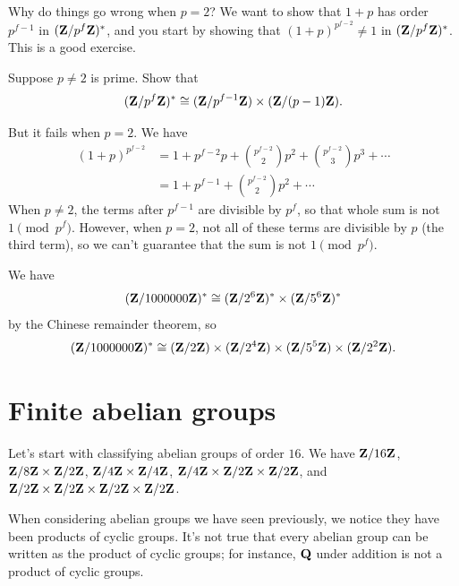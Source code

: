 \documentclass[11pt, twoside]{amsart}
\begin{document}
Why do things go wrong when $p=2$? We want to show that $1+p$ has order $p^{f-1}$ in $(\mathbf{Z}/ {p^f}\mathbf{Z})^*$, and you start by showing that $(1+p)^{p^{f-2}}\ne 1$ in $(\mathbf{Z}/ {p^f}\mathbf{Z})^*$. This is a good exercise.

\begin{exercise}
Suppose $p\ne 2$ is prime. Show that 
$$
(\mathbf{Z}/ {p^f}\mathbf{Z})^* \cong (\mathbf{Z}/ {p^{f-1}}\mathbf{Z}) \times (\mathbf{Z}/ {(p-1)}\mathbf{Z}).
$$
\end{exercise}

But it fails when $p=2$. We have
\begin{align*}
(1+p)^{p^{f-2}} &= 1 + p^{f-2} p + \binom{p^{f-2}}{2} p^2 + \binom{p^{f-2}}{3} p^3 + \cdots\\
&= 1 + p^{f-1} + \binom{p^{f-2}}{2} p^2 + \cdots
\end{align*}
When $p\ne 2$, the terms after $p^{f-1}$ are divisible by $p^f$, so that whole sum is not $1\pmod {p^f}$. However, when $p=2$, not all of these terms are divisible by $p$ (the third term), so we can't guarantee that the sum is not $1\pmod {p^f}$.
\begin{example}
We have
$$
(\mathbf{Z}/1000000\mathbf{Z} )^* \cong (\mathbf{Z}/ {2^6}\mathbf{Z})^* \times (\mathbf{Z}/5^6\mathbf{Z})^*
$$
by the Chinese remainder theorem, so
$$
(\mathbf{Z}/1000000\mathbf{Z} )^* \cong (\mathbf{Z}/ {2}\mathbf{Z}) \times (\mathbf{Z}/2^4\mathbf{Z}) \times (\mathbf{Z}/ {5^5}\mathbf{Z}) \times (\mathbf{Z}/ {2^2}\mathbf{Z}).
$$
\end{example}

\section{Finite abelian groups}
Let's start with classifying abelian groups of order $16$. We have $\mathbf{Z}/{16}\mathbf{Z}$, $\mathbf{Z}/8\mathbf{Z} \times \mathbf{Z}/2\mathbf{Z} $, $\mathbf{Z}/4\mathbf{Z}  \times \mathbf{Z}/4\mathbf{Z} $, $\mathbf{Z}/4\mathbf{Z}  \times \mathbf{Z}/2\mathbf{Z} \times\mathbf{Z}/2\mathbf{Z} $, and $\mathbf{Z}/2\mathbf{Z}  \times \mathbf{Z}/2\mathbf{Z} \times \mathbf{Z}/2\mathbf{Z} \times \mathbf{Z}/2\mathbf{Z} $. 

When considering abelian groups we have seen previously, we notice they have been products of cyclic groups. It's not true that every abelian group can be written as the product of cyclic groups; for instance, $\mathbf Q $ under addition is not a product of cyclic groups.
\end{document}
